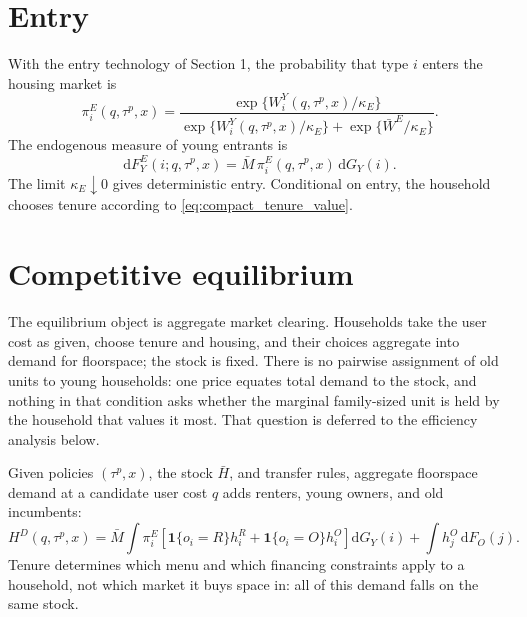 \documentclass[11pt]{article}
\newcommand{\dd}{\mathrm d}
\newcommand{\1}{\mathbf 1}
\begin{document}
\section{Entry}

With the entry technology of Section 1, the probability that type $i$ enters the housing market is
\begin{equation}
\pi_i^E(q,\tau^p,x)
=
\frac{
\exp\{W_i^Y(q,\tau^p,x)/\kappa_E\}
}{
\exp\{W_i^Y(q,\tau^p,x)/\kappa_E\}
+
\exp\{\bar W^E/\kappa_E\}
}.
\label{eq:compact_entry_prob}
\end{equation}
The endogenous measure of young entrants is
\[
\dd F_Y^E(i;q,\tau^p,x)
=
\bar M\,\pi_i^E(q,\tau^p,x)\,\dd G_Y(i).
\]
The limit $\kappa_E\downarrow0$ gives deterministic entry. Conditional on entry, the household chooses tenure according to \eqref{eq:compact_tenure_value}.

\section{Competitive equilibrium}

The equilibrium object is aggregate market clearing. Households take the user cost as given, choose tenure and housing, and their choices aggregate into demand for floorspace; the stock is fixed. There is no pairwise assignment of old units to young households: one price equates total demand to the stock, and nothing in that condition asks whether the marginal family-sized unit is held by the household that values it most. That question is deferred to the efficiency analysis below.

Given policies $(\tau^p,x)$, the stock $\bar H$, and transfer rules, aggregate floorspace demand at a candidate user cost $q$ adds renters, young owners, and old incumbents:
\[
H^{D}(q,\tau^p,x)
=
\bar M\int \pi_i^E
\left[
\1\{o_i=R\}h_i^R+\1\{o_i=O\}h_i^O
\right]\dd G_Y(i)
+
\int h_j^O\,\dd F_O(j).
\]
Tenure determines which menu and which financing constraints apply to a household, not which market it buys space in: all of this demand falls on the same stock.
\end{document}
